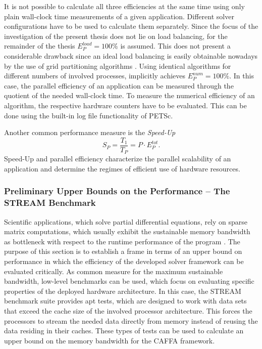 It is not possible to calculate all three efficiencies at the same time using only plain wall-clock time measurements of a given application.  Different solver configurations have to be used to calculate them separately. Since the focus of the investigation of the present thesis does not lie on load balancing, for the remainder of the thesis \(E^{load}_P = 100\%  \) is assumed. This does not present a considerable drawback since an ideal load balancing is easily obtainable nowadays by the use of grid partitioning algorithms \cite{ferziger02}. Using identical algorithms for different numbers of involved processes, implicitly achieves \(E^{num}_P = 100 \%\). In this case, the parallel efficiency of an application can be measured through the quotient of the needed wall-clock time. To measure the numerical efficiency of an algorithm, the respective hardware counters have to be evaluated. This can be done using the built-in log file functionality of PETSc. 

Another common performance measure is the \emph{Speed-Up}
\begin{displaymath}
  S_P = \frac{T_1}{T_P} = P \cdot E^{tot}_P.
\end{displaymath}
Speed-Up and parallel efficiency characterize the parallel scalability of an application and determine the regimes of efficient use of hardware resources.

\subsubsection{Preliminary Upper Bounds on the Performance -- The STREAM Benchmark}

Scientific applications, which solve partial differential equations, rely on sparse matrix computations, which usually exhibit the sustainable memory bandwidth as bottleneck with respect to the runtime performance of the program \cite{hager11}. The purpose of this section is to establish a frame in terms of an upper bound on performance in which the efficiency of the developed solver framework can be evaluated critically. As common measure for the maximum sustainable bandwidth, low-level benchmarks can be used, which focus on evaluating specific properties of the deployed hardware architecture. In this case, the STREAM benchmark suite \cite{mccalpin07,mccalpin95} provides apt tests, which are designed to work with data sets that exceed the cache size of the involved processor architecture. This forces the processors to stream the needed data directly from memory instead of reusing the data residing in their caches. These types of tests can be used to calculate an upper bound on the memory bandwidth for the CAFFA framework.

